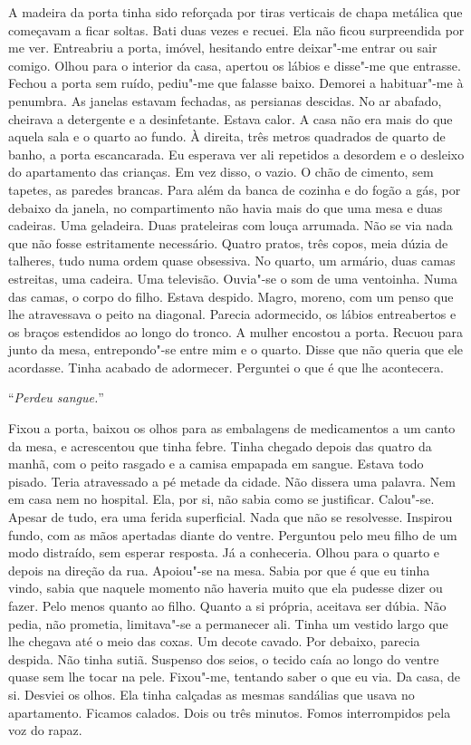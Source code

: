 A madeira da porta tinha sido reforçada por tiras verticais de chapa
metálica que começavam a ficar soltas. Bati duas vezes e recuei. Ela não
ficou surpreendida por me ver. Entreabriu a porta, imóvel, hesitando
entre deixar"-me entrar ou sair comigo. Olhou para o interior da casa,
apertou os lábios e disse"-me que entrasse. Fechou a porta sem ruído,
pediu"-me que falasse baixo. Demorei a habituar"-me à penumbra. As
janelas estavam fechadas, as persianas descidas. No ar abafado, cheirava a
detergente e a desinfetante. Estava calor. A casa não era mais do que
aquela sala e o quarto ao fundo. À direita, três metros quadrados de
quarto de banho, a porta escancarada. Eu esperava ver ali repetidos a
desordem e o desleixo do apartamento das crianças. Em vez disso, o
vazio. O chão de cimento, sem tapetes, as paredes brancas. Para além da
banca de cozinha e do fogão a gás, por debaixo da janela, no
compartimento não havia mais do que uma mesa e duas cadeiras. Uma
geladeira. Duas prateleiras com louça arrumada. Não se via nada que
não fosse estritamente necessário. Quatro pratos, três copos, meia dúzia
de talheres, tudo numa ordem quase obsessiva. No quarto, um armário,
duas camas estreitas, uma cadeira. Uma televisão. Ouvia"-se o som de uma
ventoinha. Numa das camas, o corpo do filho. Estava despido. Magro,
moreno, com um penso que lhe atravessava o peito na diagonal. Parecia
adormecido, os lábios entreabertos e os braços estendidos ao longo do
tronco. A mulher encostou a porta. Recuou para junto da mesa,
entrepondo"-se entre mim e o quarto. Disse que não queria que ele
acordasse. Tinha acabado de adormecer. Perguntei o que é que lhe
acontecera.

``\emph{Perdeu sangue.}''

Fixou a porta, baixou os olhos para as embalagens de medicamentos a um
canto da mesa, e acrescentou que tinha febre. Tinha chegado depois das
quatro da manhã, com o peito rasgado e a camisa empapada em sangue.
Estava todo pisado. Teria atravessado a pé metade da cidade. Não dissera
uma palavra. Nem em casa nem no hospital. Ela, por si, não sabia como se
justificar. Calou"-se. Apesar de tudo, era uma ferida superficial. Nada
que não se resolvesse. Inspirou fundo, com as mãos apertadas diante do
ventre. Perguntou pelo meu filho de um modo distraído, sem esperar
resposta. Já a conheceria. Olhou para o quarto e depois na direção da
rua. Apoiou"-se na mesa. Sabia por que é que eu tinha vindo, sabia que
naquele momento não haveria muito que ela pudesse dizer ou fazer. Pelo
menos quanto ao filho. Quanto a si própria, aceitava ser dúbia. Não
pedia, não prometia, limitava"-se a permanecer ali. Tinha um vestido
largo que lhe chegava até o meio das coxas. Um decote cavado. Por
debaixo, parecia despida. Não tinha sutiã. Suspenso dos seios, o tecido
caía ao longo do ventre quase sem lhe tocar na pele. Fixou"-me, tentando
saber o que eu via. Da casa, de si. Desviei os olhos. Ela tinha calçadas
as mesmas sandálias que usava no apartamento. Ficamos calados. Dois ou
três minutos. Fomos interrompidos pela voz do rapaz.

